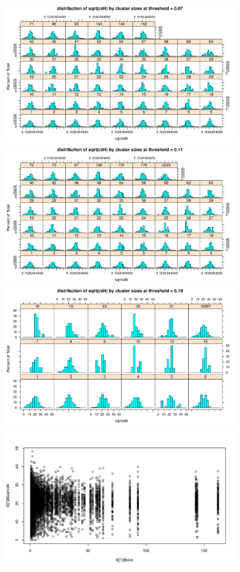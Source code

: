 \documentclass[]{revtex4}\usepackage[]{graphicx}\usepackage[]{color}
\newenvironment{knitrout}{}{} %
\begin{document}
\begin{knitrout}
{\centering \includegraphics[width=10cm]{figure/plotlattice_UK-1} 
\includegraphics[width=10cm]{figure/plotlattice_UK-2} 
\includegraphics[width=10cm]{figure/plotlattice_UK-3} 
\includegraphics[width=10cm]{figure/plotlattice_UK-4} 

}



\end{knitrout}
\end{document}
